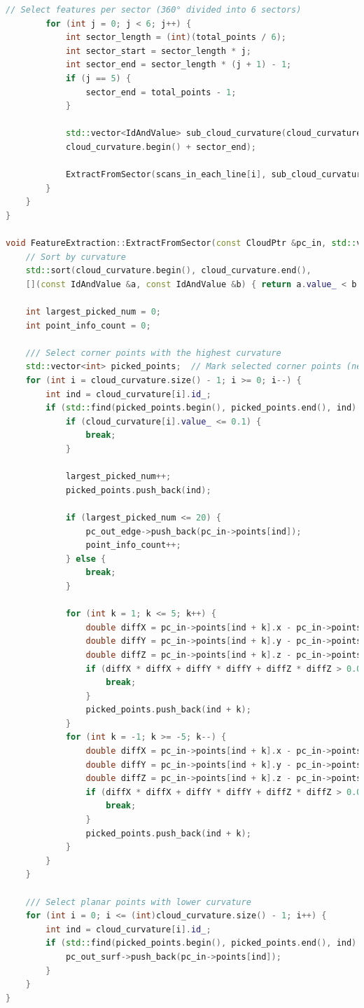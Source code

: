 \begin{lstlisting}[language=c++,caption=src/ch7/loam\_like/feature\_extraction.cc]
		// Select features per sector (360° divided into 6 sectors)  
		for (int j = 0; j < 6; j++) {  
			int sector_length = (int)(total_points / 6);  
			int sector_start = sector_length * j;  
			int sector_end = sector_length * (j + 1) - 1;  
			if (j == 5) {  
				sector_end = total_points - 1;  
			}  
			
			std::vector<IdAndValue> sub_cloud_curvature(cloud_curvature.begin() + sector_start,  
			cloud_curvature.begin() + sector_end);  
			
			ExtractFromSector(scans_in_each_line[i], sub_cloud_curvature, pc_out_edge, pc_out_surf);  
		}  
	}  
}  

void FeatureExtraction::ExtractFromSector(const CloudPtr &pc_in, std::vector<IdAndValue> &cloud_curvature, CloudPtr &pc_out_edge, CloudPtr &pc_out_surf) {  
	// Sort by curvature  
	std::sort(cloud_curvature.begin(), cloud_curvature.end(),  
	[](const IdAndValue &a, const IdAndValue &b) { return a.value_ < b.value_; });  
	
	int largest_picked_num = 0;  
	int point_info_count = 0;  
	
	/// Select corner points with the highest curvature  
	std::vector<int> picked_points;  // Mark selected corner points (neighboring points are excluded)  
	for (int i = cloud_curvature.size() - 1; i >= 0; i--) {  
		int ind = cloud_curvature[i].id_;  
		if (std::find(picked_points.begin(), picked_points.end(), ind) == picked_points.end()) {  
			if (cloud_curvature[i].value_ <= 0.1) {  
				break;  
			}  
			
			largest_picked_num++;  
			picked_points.push_back(ind);  
			
			if (largest_picked_num <= 20) {  
				pc_out_edge->push_back(pc_in->points[ind]);  
				point_info_count++;  
			} else {  
				break;  
			}  
			
			for (int k = 1; k <= 5; k++) {  
				double diffX = pc_in->points[ind + k].x - pc_in->points[ind + k - 1].x;  
				double diffY = pc_in->points[ind + k].y - pc_in->points[ind + k - 1].y;  
				double diffZ = pc_in->points[ind + k].z - pc_in->points[ind + k - 1].z;  
				if (diffX * diffX + diffY * diffY + diffZ * diffZ > 0.05) {  
					break;  
				}  
				picked_points.push_back(ind + k);  
			}  
			for (int k = -1; k >= -5; k--) {  
				double diffX = pc_in->points[ind + k].x - pc_in->points[ind + k + 1].x;  
				double diffY = pc_in->points[ind + k].y - pc_in->points[ind + k + 1].y;  
				double diffZ = pc_in->points[ind + k].z - pc_in->points[ind + k + 1].z;  
				if (diffX * diffX + diffY * diffY + diffZ * diffZ > 0.05) {  
					break;  
				}  
				picked_points.push_back(ind + k);  
			}  
		}  
	}  
	
	/// Select planar points with lower curvature  
	for (int i = 0; i <= (int)cloud_curvature.size() - 1; i++) {  
		int ind = cloud_curvature[i].id_;  
		if (std::find(picked_points.begin(), picked_points.end(), ind) == picked_points.end()) {  
			pc_out_surf->push_back(pc_in->points[ind]);  
		}  
	}  
}  
\end{lstlisting}  

